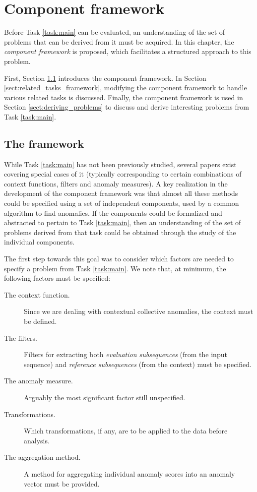 \chapter{Component framework}
\label{ch:methods}

Before Task \ref{task:main} can be evaluated, an understanding of the set of problems that can be derived from it must be acquired. In this chapter, the \emph{component framework} is proposed, which facilitates a structured approach to this problem.

First, Section \ref{sect:framework} introduces the component framework. In Section \ref{sect:related_tasks_framework}, modifying the component framework to handle various related tasks is discussed. Finally, the component framework is used in Section \ref{sect:deriving_problems} to discuss and derive interesting problems from Task \ref{task:main}.

\section{The framework}
\label{sect:framework}

While Task \ref{task:main} has not been previously studied, several papers exist covering special cases of it (typically corresponding to certain combinations of context functions, filters and anomaly measures). A key realization in the development of the component framework was that almost all these methods could be specified using a set of independent components, used by a common algorithm to find anomalies. If the components could be formalized and abstracted to pertain to Task \ref{task:main}, then an understanding of the set of problems derived from that task could be obtained through the study of the individual components.

The first step towards this goal was to consider which factors are needed to specify a problem from Task \ref{task:main}. We note that, at minimum, the following factors must be specified:

\begin{description}
  \item[The context function.] Since we are dealing with contextual collective anomalies, the context must be defined.
  \item[The filters.] Filters for extracting both \emph{evaluation subsequences} (from the input sequence) and \emph{reference subsequences} (from the context) must be specified.
  \item[The anomaly measure.] Arguably the most significant factor still unspecified.
  \item[Transformations.] Which transformations, if any, are to be applied to the data before analysis.
  \item[The aggregation method.] A method for aggregating individual anomaly scores into an anomaly vector must be provided.
\end{description}

